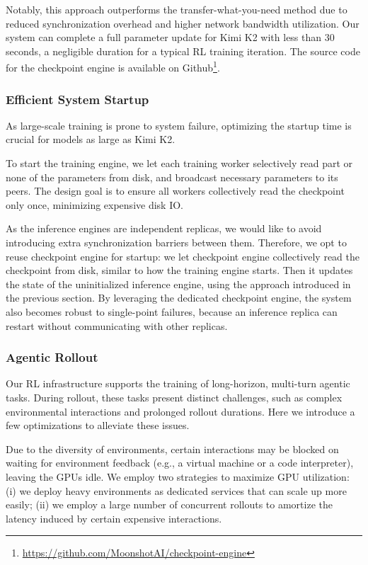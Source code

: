 Notably, this approach outperforms the transfer-what-you-need method due to reduced synchronization overhead and higher network bandwidth utilization.
Our system can complete a full parameter update for Kimi K2 with less than 30 seconds, a negligible duration for a typical RL training iteration. The source code for the checkpoint engine is available on Github\footnote{\url{https://github.com/MoonshotAI/checkpoint-engine}}.




\subsubsection{Efficient System Startup}

As large-scale training is prone to system failure, optimizing the startup time is crucial for models as large as Kimi K2.

To start the training engine, we let each training worker selectively read part or none of the parameters from disk, and broadcast necessary parameters to its peers. The design goal is to ensure all workers collectively read the checkpoint only once, minimizing expensive disk IO. 

As the inference engines are independent replicas, we would like to avoid introducing extra synchronization barriers between them. Therefore, we opt to reuse checkpoint engine for startup: we let checkpoint engine collectively read the checkpoint from disk, similar to how the training engine starts. Then it updates the state of the uninitialized inference engine, using the approach introduced in the previous section. By leveraging the dedicated checkpoint engine, the system also becomes robust to single-point failures, because an inference replica can restart without communicating with other replicas.




\subsubsection{Agentic Rollout}
Our RL infrastructure supports the training of long-horizon, multi-turn agentic tasks. During rollout, these tasks present distinct challenges, such as complex environmental interactions and prolonged rollout durations. Here we introduce a few optimizations to alleviate these issues.

Due to the diversity of environments, certain interactions may be blocked on waiting for environment feedback (e.g., a virtual machine or a code interpreter), leaving the GPUs idle. We employ two strategies to maximize GPU utilization: (i) we deploy heavy environments as dedicated services that can scale up more easily; (ii) we employ a large number of concurrent rollouts to amortize the latency induced by certain expensive interactions.

